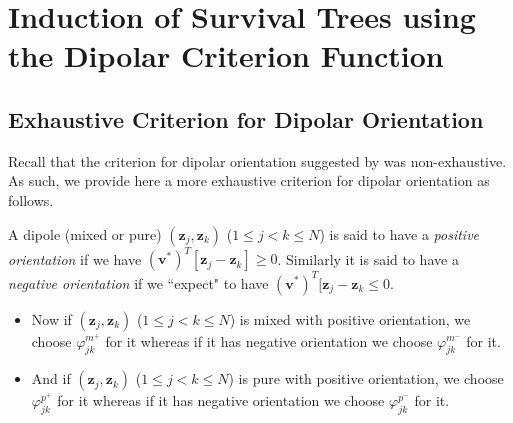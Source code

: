 \documentclass[12pt]{amsart}
\theoremstyle{definition}
\theoremstyle{plain}
\theoremstyle{remark}
\begin{document}
\section{Induction of Survival Trees using the Dipolar Criterion Function}


\subsection{Exhaustive Criterion for Dipolar Orientation} %

Recall that the criterion for dipolar orientation suggested by \cite{kretowska} was non-exhaustive. As such, we provide here a more exhaustive criterion for dipolar orientation as follows.

A dipole (mixed or pure) $(\mathbf{z}_j, \mathbf{z}_k)$ ($1 \leq j < k \leq N$) is said to have a \emph{positive orientation} if we have $(\mathbf{v}^\ast)^T [\mathbf{z}_j - \mathbf{z}_k] \geq 0$. Similarly it is said to have a \emph{negative orientation} if we ``expect" \cite{kretowska} to have $(\mathbf{v}^\ast)^T [\mathbf{z}_j - \mathbf{z}_k \leq 0$.
	
\begin{itemize}

	\item Now if $(\mathbf{z}_j, \mathbf{z}_k)$ ($1 \leq j < k \leq N$) is mixed with positive orientation, we choose $\varphi^{m^+}_{jk}$ for it whereas if it has negative orientation  we choose $\varphi^{m^-}_{jk}$ for it. \\
	
	\item And if $(\mathbf{z}_j, \mathbf{z}_k)$ ($1 \leq j < k \leq N$) is pure with positive orientation, we choose $\varphi^{p^+}_{jk}$ for it whereas if it has negative orientation  we choose $\varphi^{p^-}_{jk}$ for it. \\
	
\end{itemize}








\end{document}

